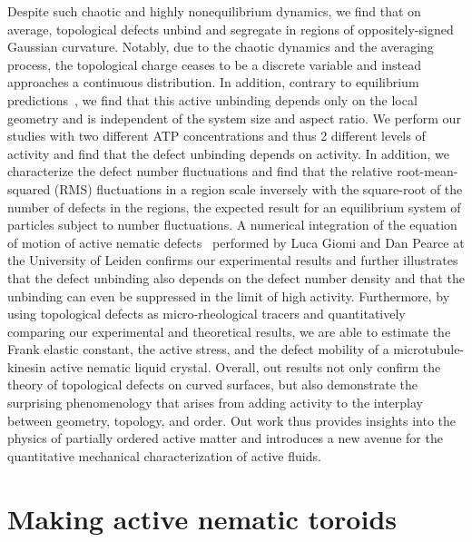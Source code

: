 Despite such chaotic and highly nonequilibrium dynamics, we find that on average, topological defects unbind and segregate in regions of oppositely-signed Gaussian curvature.
Notably, due to the chaotic dynamics and the averaging process, the topological charge ceases to be a discrete variable and instead approaches a continuous distribution.
In addition, contrary to equilibrium predictions~\cite{RN36,RN19,RN22,RN20,RN78}, we find that this active unbinding depends only on the local geometry and is independent of the system size and aspect ratio.
We perform our studies with two different ATP concentrations and thus 2 different levels of activity and find that the defect unbinding depends on activity.
In addition, we characterize the defect number fluctuations and find that the relative root-mean-squared (RMS) fluctuations in a region scale inversely with the square-root of the number of defects in the regions, the expected result for an equilibrium system of particles subject to number fluctuations.
A numerical integration of the equation of motion of active nematic defects~\cite{RN11,RN8,RN9} performed by Luca Giomi and Dan Pearce at the University of Leiden confirms our experimental results and further illustrates that the defect unbinding also depends on the defect number density and that the unbinding can even be suppressed in the limit of high activity.
Furthermore, by using topological defects as micro-rheological tracers and quantitatively comparing our experimental and theoretical results, we are able to estimate the Frank elastic constant, the active stress, and the defect mobility of a microtubule-kinesin active nematic liquid crystal.
Overall, out results not only confirm the theory of topological defects on curved surfaces, but also demonstrate the surprising phenomenology that arises from adding activity to the interplay between geometry, topology, and order. Out work thus provides insights into the physics of partially ordered active matter and introduces a new avenue for the quantitative mechanical characterization of active fluids.


\section{Making active nematic toroids}
